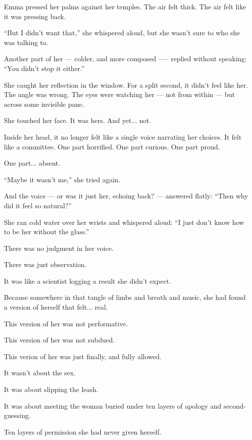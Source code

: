 Emma pressed her palms against her temples. The air felt thick. The air felt like it 
was pressing back.

``But I didn’t want that,'' she whispered aloud, but she wasn’t sure to who she was talking to.

Another part of her --- colder, and more composed —-- replied without speaking:
``You didn’t stop it either.''

She caught her reflection in the window. For a split second, it didn’t feel like her. The angle was 
wrong. The eyes were watching her --- not from within --- but across some invisible pane.

She touched her face. It was hers. And yet... not.

Inside her head, it no longer felt like a single voice narrating her choices. It felt like a committee. 
One part horrified. One part curious. One part proud.

One part... absent.

``Maybe it wasn’t me,'' she tried again.

And the voice --- or was it just her, echoing back? --- answered flatly:
``Then why did it feel so natural?''

She ran cold water over her wrists and whispered aloud:
``I just don’t know how to be her without the glass.''

There was no judgment in her voice. 

There was just observation. 

It was like a scientist logging a result she didn’t expect.

Because somewhere in that tangle of limbs and breath and music, she had found a version of herself that 
felt... real.

This version of her was not performative. 

This version of her was not subdued. 

This verion of her was just finally, and fully allowed.

It wasn’t about the sex.

It was about slipping the leash.

It was about meeting the woman buried under ten layers of apology and second-guessing.

Ten layers of permission she had never given herself.

